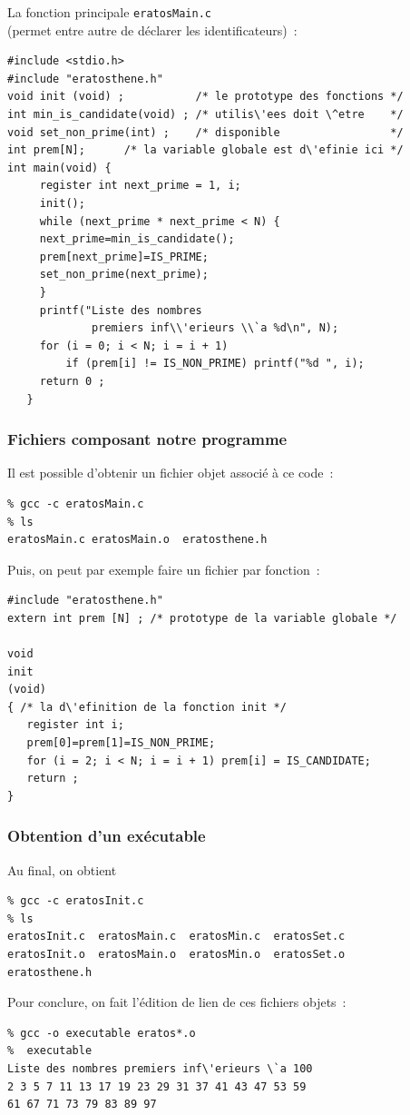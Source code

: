\begin{frame}[fragile]
 La fonction principale \texttt{eratosMain.c} \\
 (permet entre autre de d\'eclarer les identificateurs)~:
\begin{verbatim}
#include <stdio.h>
#include "eratosthene.h"
void init (void) ;           /* le prototype des fonctions */
int min_is_candidate(void) ; /* utilis\'ees doit \^etre    */
void set_non_prime(int) ;    /* disponible                 */
int prem[N];      /* la variable globale est d\'efinie ici */
int main(void) {
     register int next_prime = 1, i;
     init();
     while (next_prime * next_prime < N) {
     next_prime=min_is_candidate();
     prem[next_prime]=IS_PRIME;
     set_non_prime(next_prime);
     }
     printf("Liste des nombres 
             premiers inf\\'erieurs \\`a %d\n", N);
     for (i = 0; i < N; i = i + 1) 
         if (prem[i] != IS_NON_PRIME) printf("%d ", i);
     return 0 ;
   }
\end{verbatim}
\end{frame}
\begin{frame}[fragile]
\frametitle{Fichiers composant notre programme}
Il est possible d'obtenir un fichier objet associ\'e \`a ce code~:
\begin{verbatim}
% gcc -c eratosMain.c 
% ls
eratosMain.c eratosMain.o  eratosthene.h
\end{verbatim}
Puis, on peut par exemple faire un fichier par fonction~:
\begin{verbatim}
#include "eratosthene.h"
extern int prem [N] ; /* prototype de la variable globale */

void 
init 
(void) 
{ /* la d\'efinition de la fonction init */
   register int i;
   prem[0]=prem[1]=IS_NON_PRIME;
   for (i = 2; i < N; i = i + 1) prem[i] = IS_CANDIDATE;
   return ;
}
\end{verbatim}
\end{frame}
\begin{frame}[fragile]
\frametitle{Obtention d'un ex\'ecutable}
Au final, on obtient
\begin{verbatim}
% gcc -c eratosInit.c 
% ls
eratosInit.c  eratosMain.c  eratosMin.c  eratosSet.c  
eratosInit.o  eratosMain.o  eratosMin.o  eratosSet.o 
eratosthene.h
\end{verbatim}
Pour conclure, on fait l'\'edition de lien de ces fichiers objets~:
\begin{verbatim}
% gcc -o executable eratos*.o
%  executable 
Liste des nombres premiers inf\'erieurs \`a 100
2 3 5 7 11 13 17 19 23 29 31 37 41 43 47 53 59 
61 67 71 73 79 83 89 97 
\end{verbatim}
\end{frame}
